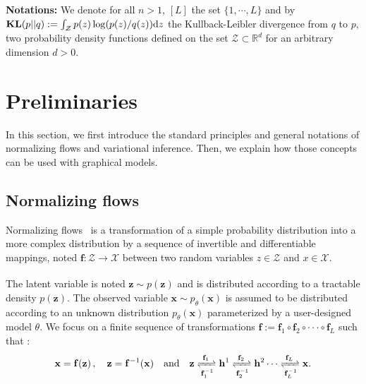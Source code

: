 \documentclass{article} %
\begin{document}
\textbf{Notations:} We denote for all $n >1$, $[L]$ the set $ \{1, \cdots, L\}$ and by $\textbf{\text{KL}}(p || q ) := \int_{\mathcal{Z}} p(z) \log(p(z)/q(z)) \mathrm{d}z$ the Kullback-Leibler divergence from $q$ to $p$, two probability density functions defined on the set $\mathcal{Z} \subset \mathbb{R}^d$ for an arbitrary dimension $d >0$.

\section{Preliminaries}\label{sec:prelim}
In this section, we first introduce the standard principles and general notations of normalizing flows and variational inference. 
Then, we explain how those concepts can be used with graphical models.

\subsection{Normalizing flows}\label{subsec:nf}
Normalizing flows~\citep{kingma2018glow,rezende2015variational} is a transformation of a simple probability distribution into a more complex distribution by a sequence of invertible and differentiable mappings, noted $\mathbf{f}: \mathcal{Z} \xrightarrow[]{} \mathcal{X}$ between two random variables $z \in \mathcal{Z}$ and $x \in \mathcal{X}$. 

The latent variable is noted $\mathbf{z} \sim p(\mathbf{z})$ and is distributed according to a tractable density $p(\mathbf{z})$. 
The observed variable $\mathbf{x} \sim p_\theta(\mathbf{x})$ is assumed to be distributed according to an unknown distribution $p_\theta(\mathbf{x})$ parameterized by a user-designed model $\theta$. 
We focus on a finite sequence of transformations $\mathbf{f}:=\mathbf{f}_1  \circ \mathbf{f}_2 \circ   \cdot  \cdot \cdot     \circ   \mathbf{f}_L$ such that :
\begin{align*}
\mathbf{x}=\mathbf{f}(\mathbf{z})\, , \quad \mathbf{z}=\mathbf{f}^{-1}(\mathbf{x}) \quad \textrm{and} \quad
    \mathbf{z} \xrightleftharpoons[\mathbf{f}_1^{-1}]{\mathbf{f}_1} \mathbf{h}^1 \xrightleftharpoons[\mathbf{f}_2^{-1}]{\mathbf{f}_2} \mathbf{h}^2 \cdots \xrightleftharpoons[\mathbf{f}_L^{-1}]{\mathbf{f}_L}\mathbf{x}.
\end{align*}
\end{document}
